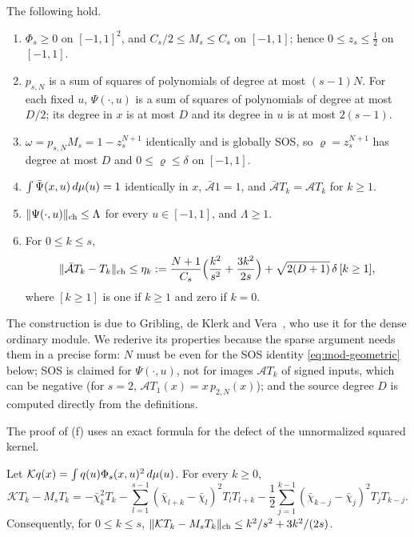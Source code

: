\begin{lemma}\label{lem:sos-kernel}
The following hold.
\begin{enumerate}[label=(\alph*)]
\item $\Phi_s\ge0$ on $[-1,1]^2$, and $C_s/2\le M_s\le C_s$ on $[-1,1]$;
  hence $0\le z_s\le\frac12$ on $[-1,1]$.
\item $p_{s,N}$ is a sum of squares of polynomials of degree at most
  $(s-1)N$. For each fixed $u$, $\Psi(\cdot,u)$ is a sum of squares of
  polynomials of degree at most $D/2$; its degree in $x$ is at most $D$ and
  its degree in $u$ is at most $2(s-1)$.
\item $\omega=p_{s,N}M_s=1-z_s^{N+1}$ identically and is globally SOS,
  so $\varrho=z_s^{N+1}$
  has degree at most $D$ and $0\le\varrho\le\delta$ on $[-1,1]$.
\item $\int\bar\Psi(x,u)\,d\mu(u)=1$ identically in $x$, $\bar{\mathcal
  A}1=1$, and $\bar{\mathcal A}T_k=\mathcal AT_k$ for $k\ge1$.
\item $\lVert \Psi(\cdot,u)\rVert_{\mathrm{ch}}\le\Lambda$ for every $u\in[-1,1]$, and
  $\Lambda\ge1$.
\item For $0\le k\le s$,
  \begin{equation}\label{eq:mod-univariate}
    \lVert \bar{\mathcal A}T_k-T_k\rVert_{\mathrm{ch}}\le\eta_k:=
    \frac{N+1}{C_s}\Bigl(\frac{k^2}{s^2}+\frac{3k^2}{2s}\Bigr)
    +\sqrt{2(D+1)}\,\delta\,[k\ge1],
  \end{equation}
  where $[k\ge1]$ is one if $k\ge1$ and zero if $k=0$.
\end{enumerate}
\end{lemma}

The construction is due to Gribling, de Klerk and
Vera~\cite{gribling2026-squared-kernels}, who use it for the dense ordinary
module. We rederive its properties because the sparse argument needs them in
a precise form: $N$ must be even for the SOS identity \eqref{eq:mod-geometric}
below; SOS is claimed for $\Psi(\cdot,u)$, not for images $\mathcal AT_k$
of signed inputs, which can be negative (for $s=2$, $\mathcal AT_1(x)=
x\,p_{2,N}(x)$); and the source degree $D$ is computed directly from the
definitions.

The proof of (f) uses an exact formula for the defect of the unnormalized
squared kernel.

\begin{lemma}\label{lem:mod-defect}
Let $\mathcal Kq(x)=\int q(u)\Phi_s(x,u)^2\,d\mu(u)$. For every $k\ge0$,
\begin{equation}\label{eq:mod-defect}
  \mathcal KT_k-M_sT_k=-\bar\chi_k^2T_k
  -\sum_{l=1}^{s-1}(\bar\chi_{l+k}-\bar\chi_l)^2T_lT_{l+k}
  -\frac12\sum_{j=1}^{k-1}(\bar\chi_{k-j}-\bar\chi_j)^2T_jT_{k-j}.
\end{equation}
Consequently, for $0\le k\le s$,
$\lVert \mathcal KT_k-M_sT_k\rVert_{\mathrm{ch}}\le k^2/s^2+3k^2/(2s)$.
\end{lemma}

